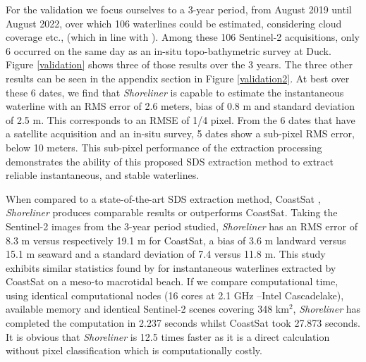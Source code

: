 \documentclass[remotesensing,technicalnote,submit,pdftex,moreauthors]{Definitions/mdpi}
\begin{document}
For the validation we focus ourselves to a 3-year period, from August 2019 until August 2022, over which 106 waterlines could be estimated, considering cloud coverage etc., (which in line with \citep{BERGSMA2020}). Among these 106 Sentinel-2 acquisitions, only 6 occurred on the same day as an in-situ topo-bathymetric survey at Duck. Figure \ref{validation} shows three of those results over the 3 years. The three other results can be seen in the appendix section in Figure \ref{validation2}. At best over these 6 dates, we find that \textit{Shoreliner} is capable to estimate the instantaneous waterline with an RMS error of 2.6 meters, bias of 0.8 m and standard deviation of 2.5 m. This corresponds to an RMSE of 1/4 pixel. From the 6 dates that have a satellite acquisition and an in-situ survey, 5 dates show a sub-pixel RMS error, below 10 meters. This sub-pixel performance of the extraction processing demonstrates the ability of this proposed SDS extraction method to extract reliable instantaneous, and stable waterlines.

When compared to a state-of-the-art SDS extraction method, CoastSat \citep{VOS2019_sub}, \textit{Shoreliner} produces comparable results or outperforms CoastSat. Taking the Sentinel-2 images from the 3-year period studied, \textit{Shoreliner} has an RMS error of 8.3 m versus respectively 19.1 m for CoastSat, a bias of 3.6 m landward versus 15.1 m seaward and a standard deviation of 7.4 versus 11.8 m. This study exhibits similar statistics found by \citep{KONSTANTINOU2023} for instantaneous waterlines extracted by CoastSat on a meso-to macrotidal beach.
If we compare computational time, using identical computational nodes (16 cores at 2.1 GHz --Intel Cascadelake), available memory and identical Sentinel-2 scenes covering 348 km$^2$, \textit{Shoreliner} has completed the computation in 2.237 seconds whilst CoastSat took 27.873 seconds. It is obvious that \textit{Shoreliner} is 12.5 times faster as it is a direct calculation without pixel classification which is computationally costly.

\end{document}
